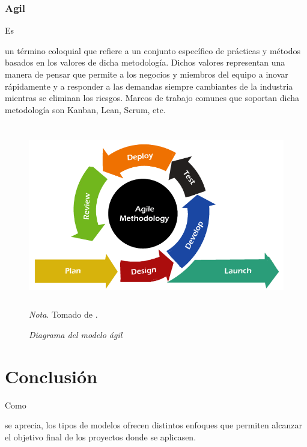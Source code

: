 \documentclass[stu, 12pt, letterpaper, donotrepeattitle, floatsintext, natbib]{apa7}
\begin{document}
\subsubsection{Agil}
Es \begin{justifying}
    un término coloquial que refiere a un conjunto específico de prácticas y métodos basados en los valores de dicha metodología. Dichos valores representan una manera de pensar que
    permite a los negocios y miembros del equipo a inovar rápidamente y a responder a las demandas siempre cambiantes de la industria mientras se eliminan los riesgos. Marcos de trabajo comunes que
    soportan dicha metodología son Kanban, Lean, Scrum, etc.\par
\end{justifying}
\begin{figure}[H]
    \caption{\emph{Diagrama del modelo ágil\\}}
    \centering
    \smallskip
    \includegraphics[width=12cm, height=8cm]{agile.png}
    \bigskip
    \justifying\small\textit{Nota}. Tomado de \cite{unknown-author-no-dateB}.%
\end{figure}
\vspace{\baselineskip}
\section{Conclusión}
Como \begin{justifying}
    se aprecia, los tipos de modelos ofrecen distintos enfoques que permiten alcanzar el objetivo final de los proyectos donde se aplicasen.\par
\end{justifying}
\renewcommand\refname{\textbf{Referencias}}
\end{document}
